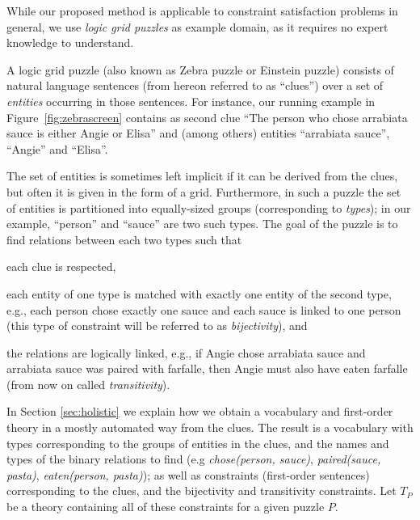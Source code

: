 While our proposed method is applicable to constraint satisfaction problems in general, we use \textit{logic grid puzzles} as example domain, as it requires no expert knowledge to understand.

A logic grid puzzle (also known as Zebra puzzle or Einstein puzzle) consists of natural language sentences (from hereon referred to as ``clues'') over a set of \emph{entities} occurring in those sentences. 
For instance, our running example in Figure~\ref{fig:zebrascreen} contains as second clue ``The person who chose arrabiata sauce is either Angie or Elisa'' and (among others) entities ``arrabiata sauce'', ``Angie'' and ``Elisa''. 

The set of entities is sometimes left implicit if it can be derived from the clues, but often it is given in the form of a grid. Furthermore, in such a puzzle the set of entities is partitioned into equally-sized groups (corresponding to \emph{types}); in our example, ``person'' and ``sauce'' are two such types. 
% 
The goal of the puzzle is to find relations between each two types such that
\begin{compactitem}
	\item each clue is respected, 
	\item each entity of one type is matched with exactly one entity of the second type, e.g., each person chose exactly one sauce and each sauce is linked to one person (this type of constraint will be referred to as \emph{bijectivity}), and 
	\item the relations are logically linked, e.g., if Angie chose arrabiata sauce and arrabiata sauce was paired with farfalle, then Angie must also have eaten farfalle (from now on called \emph{transitivity}). 
\end{compactitem}
In Section \ref{sec:holistic} we explain how we obtain a vocabulary and first-order theory in a mostly automated way from the clues. The result is a vocabulary with types corresponding to the groups of entities in the clues, and the names and types of the binary relations to find (e.g \textit{chose(person, sauce)}, \textit{paired(sauce, pasta)}, \textit{eaten(person, pasta)});
as well as constraints (first-order sentences) corresponding to the clues, and the bijectivity and transitivity constraints. Let $T_P$ be a theory containing all of these constraints for a given puzzle $P$.


